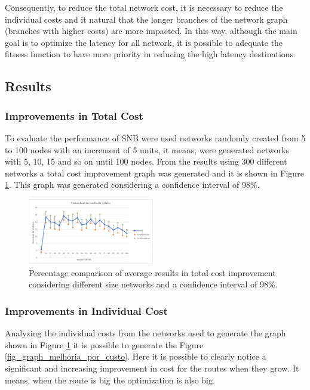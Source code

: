 \documentclass[conference]{IEEEtran}
\begin{document}
Consequently, to reduce the total network cost, it is necessary to reduce the individual costs and it natural that the longer branches of the network graph (branches with higher costs) are more impacted. In this way, although the main goal is to optimize the latency for all network, it is possible to adequate the fitness function to have more priority in reducing the high latency destinations. 

\subsection{Results}

\subsubsection{Improvements in Total Cost}
To evaluate the performance of SNB were used networks randomly created from 5 to 100 nodes with an increment of 5 units, it means, were generated networks with 5, 10, 15 and so on until 100 nodes. From the results using 300 different networks a total cost improvement graph was generated and it is shown in Figure \ref{fig_graph_bsn_medio_all}. This graph was generated considering a confidence interval of 98\%.

\begin{figure} [ht]%
	\centering
	\includegraphics[width=0.49\textwidth]{./figuras/BSN-resultados-medios-all2.png} %
	\caption{Percentage comparison of average results in total cost improvement considering different size networks and a confidence interval of 98\%.}
	\label{fig_graph_bsn_medio_all}
\end{figure}

\subsubsection{Improvements in Individual Cost}
Analyzing the individual costs from the networks used to generate the graph shown in Figure \ref{fig_graph_bsn_medio_all} it is possible to generate the Figure \ref{fig_graph_melhoria_por_custo}. Here it is possible to clearly notice a significant and increasing improvement in cost for the routes when they grow. It means, when the route is big the optimization is also big. 
\end{document}
